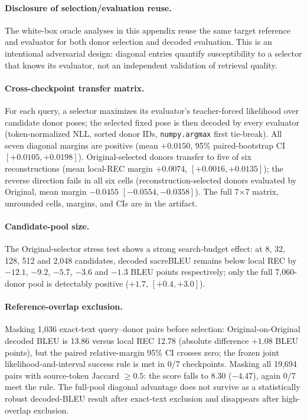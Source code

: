 \documentclass[pdflatex,sn-chicago]{sn-jnl}
\begin{document}
\paragraph{Disclosure of selection/evaluation reuse.}
The white-box oracle analyses in this appendix reuse the same target reference and evaluator for both donor selection and decoded evaluation. This is an intentional adversarial design: diagonal entries quantify susceptibility to a selector that knows its evaluator, not an independent validation of retrieval quality.

\paragraph{Cross-checkpoint transfer matrix.}
For each query, a selector maximizes its evaluator's teacher-forced likelihood over candidate donor poses; the selected fixed pose is then decoded by every evaluator (token-normalized NLL, sorted donor IDs, \texttt{numpy.argmax} first tie-break). All seven diagonal margins are positive (mean $+0.0150$, 95\% paired-bootstrap CI $[+0.0105,+0.0198]$). Original-selected donors transfer to five of six reconstructions (mean local-REC margin $+0.0074$, $[+0.0016,+0.0135]$); the reverse direction fails in all six cells (reconstruction-selected donors evaluated by Original, mean margin $-0.0455$ $[-0.0554,-0.0358]$). The full 7$\times$7 matrix, unrounded cells, margins, and CIs are in the artifact.



\paragraph{Candidate-pool size.}
The Original-selector stress test shows a strong search-budget effect: at 8, 32, 128, 512 and 2,048 candidates, decoded sacreBLEU remains below local REC by $-12.1$, $-9.2$, $-5.7$, $-3.6$ and $-1.3$ BLEU points respectively; only the full 7,060-donor pool is detectably positive ($+1.7$, $[+0.4,+3.0]$).

\paragraph{Reference-overlap exclusion.}
Masking 1,036 exact-text query--donor pairs before selection: Original-on-Original decoded BLEU is 13.86 versus local REC 12.78 (absolute difference $+1.08$ BLEU points), but the paired relative-margin 95\% CI crosses zero; the frozen joint likelihood-and-interval success rule is met in 0/7 checkpoints. Masking all 19,694 pairs with source-token Jaccard $\geq 0.5$: the score falls to 8.30 ($-4.47$), again 0/7 meet the rule. The full-pool diagonal advantage does not survive as a statistically robust decoded-BLEU result after exact-text exclusion and disappears after high-overlap exclusion.
\end{document}
